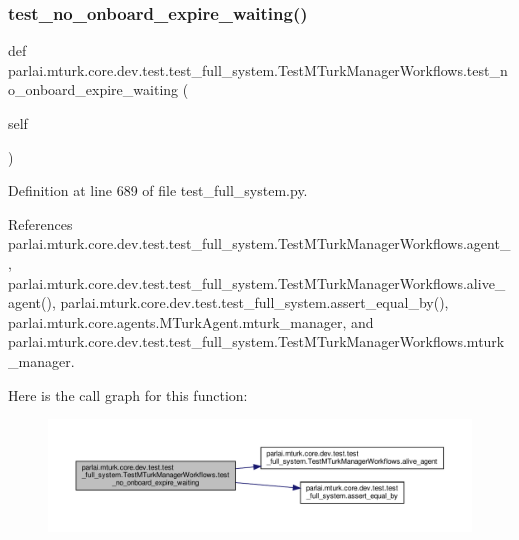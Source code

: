 \subsubsection{\texorpdfstring{test\+\_\+no\+\_\+onboard\+\_\+expire\+\_\+waiting()}{test\_no\_onboard\_expire\_waiting()}}
{\footnotesize\ttfamily def parlai.\+mturk.\+core.\+dev.\+test.\+test\+\_\+full\+\_\+system.\+Test\+M\+Turk\+Manager\+Workflows.\+test\+\_\+no\+\_\+onboard\+\_\+expire\+\_\+waiting (\begin{DoxyParamCaption}\item[{}]{self }\end{DoxyParamCaption})}



Definition at line 689 of file test\+\_\+full\+\_\+system.\+py.



References parlai.\+mturk.\+core.\+dev.\+test.\+test\+\_\+full\+\_\+system.\+Test\+M\+Turk\+Manager\+Workflows.\+agent\+\_, parlai.\+mturk.\+core.\+dev.\+test.\+test\+\_\+full\+\_\+system.\+Test\+M\+Turk\+Manager\+Workflows.\+alive\+\_\+agent(), parlai.\+mturk.\+core.\+dev.\+test.\+test\+\_\+full\+\_\+system.\+assert\+\_\+equal\+\_\+by(), parlai.\+mturk.\+core.\+agents.\+M\+Turk\+Agent.\+mturk\+\_\+manager, and parlai.\+mturk.\+core.\+dev.\+test.\+test\+\_\+full\+\_\+system.\+Test\+M\+Turk\+Manager\+Workflows.\+mturk\+\_\+manager.

Here is the call graph for this function\+:
\nopagebreak
\begin{figure}[H]
\begin{center}
\leavevmode
\includegraphics[width=350pt]{classparlai_1_1mturk_1_1core_1_1dev_1_1test_1_1test__full__system_1_1TestMTurkManagerWorkflows_aea7f86b35f032a0f71f92b6e1a207a61_cgraph}
\end{center}
\end{figure}
\mbox{\label{classparlai_1_1mturk_1_1core_1_1dev_1_1test_1_1test__full__system_1_1TestMTurkManagerWorkflows_a584e2c301ed81a4cd3b68520ed6e0096}} 
